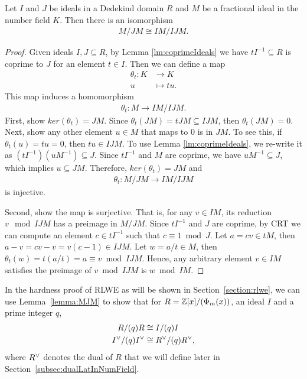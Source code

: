 \documentclass[../main.tex]{subfiles}
\begin{document}
\begin{lemma}\label{lemma:MJM}
Let $I$ and $J$ be ideals in a Dedekind domain $R$ and $M$ be a fractional ideal in the number field $K$. Then there is an isomorphism 
\begin{align*}
    M/JM \cong IM/IJM.
\end{align*}
\end{lemma}
\begin{proof}
Given ideals $I,J\subseteq R$, by Lemma \ref{lm:coprimeIdeals} we have $tI^{-1} \subseteq R$ is coprime to $J$ for an element $t \in I$. Then we can define a map 
\begin{align*}
    \theta_t: K &\rightarrow K \\
    u &\mapsto tu.
\end{align*}
This map induces a homomorphism 
\begin{align*}
    \theta_t: M \rightarrow IM/IJM.
\end{align*}
First, show $ker(\theta_t)=JM$. Since $\theta_t(JM)=tJM \subseteq IJM$, then $\theta_t(JM)=0$. Next, show any other element $u \in M$ that maps to 0 is in $JM$. To see this, if $\theta_t(u)=tu=0$, then $tu \in IJM$. To use Lemma \ref{lm:coprimeIdeals}, we re-write it as $(tI^{-1}) (uM^{-1})\subseteq J$. Since $tI^{-1}$ and $M$ are coprime, we have $uM^{-1}\subseteq J$, which implies $u\subseteq JM$. Therefore, $ker(\theta_t)=JM$ and
\begin{align*}
    \theta_t: M/JM \rightarrow IM/IJM
\end{align*}
is injective. 

Second, show the map is surjective. That is, for any $v \in IM$, its reduction $v \mod IJM$ has a preimage in $M/JM$. Since $tI^{-1}$ and $J$ are coprime, by CRT we can compute an element $c \in tI^{-1}$ such that $c \equiv 1 \bmod J$. Let $a = cv \in tM$, then $a-v=cv-v=v(c-1) \in IJM$. Let $w=a/t \in M$, then $\theta_t(w)=t (a/t)=a \equiv v \bmod IJM$. Hence, any arbitrary element $v \in IM$ satisfies the preimage of $v \bmod IJM$ is $w \bmod IM$. 
\end{proof}

In the hardness proof of RLWE as will be shown in Section~\ref{section:rlwe}, we can use Lemma~\ref{lemma:MJM} to show that for $R = \mathbb{Z}[x]/(\Phi_m(x))$, an ideal $I$ and a prime integer $q$,
\begin{align*}
    R/(q)R &\cong I/(q)I  \\
    I^{\vee} / (q)I^{\vee} &\cong R^{\vee} / (q)R^{\vee},
\end{align*}
where $R^{\vee}$ denotes the dual of $R$ that we will define later in Section~\ref{subsec:dualLatInNumField}.
\end{document}
